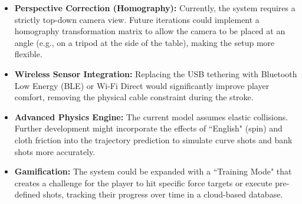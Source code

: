 \begin{itemize}
    \item \textbf{Perspective Correction (Homography):} Currently, the system requires a strictly top-down camera view. Future iterations could implement a homography transformation matrix to allow the camera to be placed at an angle (e.g., on a tripod at the side of the table), making the setup more flexible.
    \item \textbf{Wireless Sensor Integration:} Replacing the USB tethering with Bluetooth Low Energy (BLE) or Wi-Fi Direct would significantly improve player comfort, removing the physical cable constraint during the stroke.
    \item \textbf{Advanced Physics Engine:} The current model assumes elastic collisions. Further development might incorporate the effects of ``English" (spin) and cloth friction into the trajectory prediction to simulate curve shots and bank shots more accurately.
    \item \textbf{Gamification:} The system could be expanded with a ``Training Mode" that creates a challenge for the player to hit specific force targets or execute pre-defined shots, tracking their progress over time in a cloud-based database.
\end{itemize}